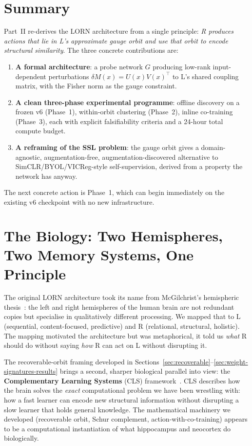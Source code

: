 \documentclass[11pt, a4paper]{article}
\theoremstyle{plain}
\theoremstyle{definition}
\theoremstyle{remark}
\begin{document}
\section{Summary}
\label{sec:part2-summary}

Part~II re-derives the LORN architecture from a single principle: \emph{R produces actions that lie in L's approximate gauge orbit and use that orbit to encode structural similarity}.
The three concrete contributions are:
\begin{enumerate}[nosep]
\item \textbf{A formal architecture}: a probe network $G$ producing low-rank input-dependent perturbations $\delta M(x) = U(x) V(x)^{\!\top}$ to L's shared coupling matrix, with the Fisher norm as the gauge constraint.
\item \textbf{A clean three-phase experimental programme}: offline discovery on a frozen v6 (Phase~1), within-orbit clustering (Phase~2), inline co-training (Phase~3), each with explicit falsifiability criteria and a 24-hour total compute budget.
\item \textbf{A reframing of the SSL problem}: the gauge orbit gives a domain-agnostic, augmentation-free, augmentation-discovered alternative to SimCLR/BYOL/VICReg-style self-supervision, derived from a property the network has anyway.
\end{enumerate}
The next concrete action is Phase~1, which can begin immediately on the existing v6 checkpoint with no new infrastructure.


\section{The Biology: Two Hemispheres, Two Memory Systems, One Principle}
\label{sec:biology}

The original LORN architecture took its name from McGilchrist's hemispheric thesis~\cite{mcgilchrist2009master, mcgilchrist2021matter}: the left and right hemispheres of the human brain are not redundant copies but specialise in qualitatively different processing.
We mapped that to L (sequential, content-focused, predictive) and R (relational, structural, holistic).
The mapping motivated the architecture but was metaphorical, it told us \emph{what} R should do without saying \emph{how} R can act on L without disrupting it.

The recoverable-orbit framing developed in Sections~\ref{sec:recoverable}--\ref{sec:weight-signatures-results} brings a second, sharper biological parallel into view: the \textbf{Complementary Learning Systems} (CLS) framework~\cite{mcclelland1995cls, kumaran2016cls}.
CLS describes how the brain solves the \emph{exact} computational problem we have been wrestling with: how a fast learner can encode new structural information without disrupting a slow learner that holds general knowledge.
The mathematical machinery we developed (recoverable orbit, Schur complement, action-with-co-training) appears to be a computational instantiation of what hippocampus and neocortex do biologically.
\end{document}
